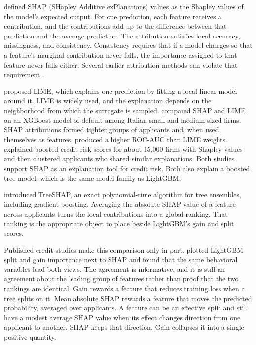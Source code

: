 \citet{lundberg2017shap} defined SHAP (SHapley Additive exPlanations) values as the Shapley values of the model's expected output. For one prediction, each feature receives a contribution, and the contributions add up to the difference between that prediction and the average prediction. The attribution satisfies local accuracy, missingness, and consistency. Consistency requires that if a model changes so that a feature's marginal contribution never falls, the importance assigned to that feature never falls either. Several earlier attribution methods can violate that requirement \citep{lundberg2017shap}.

\citet{ribeiro2016lime} proposed LIME, which explains one prediction by fitting a local linear model around it. LIME is widely used, and the explanation depends on the neighborhood from which the surrogate is sampled. \citet{gramegna2021shap} compared SHAP and LIME on an XGBoost model of default among Italian small and medium-sized firms. SHAP attributions formed tighter groups of applicants and, when used themselves as features, produced a higher ROC-AUC than LIME weights. \citet{bussmann2021explainable} explained boosted credit-risk scores for about 15,000 firms with Shapley values and then clustered applicants who shared similar explanations. Both studies support SHAP as an explanation tool for credit risk. Both also explain a boosted tree model, which is the same model family as LightGBM.

\citet{lundberg2020treeshap} introduced TreeSHAP, an exact polynomial-time algorithm for tree ensembles, including gradient boosting. Averaging the absolute SHAP value of a feature across applicants turns the local contributions into a global ranking. That ranking is the appropriate object to place beside LightGBM's gain and split scores.

Published credit studies make this comparison only in part. \citet{delange2022xai} plotted LightGBM split and gain importance next to SHAP and found that the same behavioral variables lead both views. The agreement is informative, and it is still an agreement about the leading group of features rather than proof that the two rankings are identical. Gain rewards a feature that reduces training loss when a tree splits on it. Mean absolute SHAP rewards a feature that moves the predicted probability, averaged over applicants. A feature can be an effective split and still have a modest average SHAP value when its effect changes direction from one applicant to another. SHAP keeps that direction. Gain collapses it into a single positive quantity.

